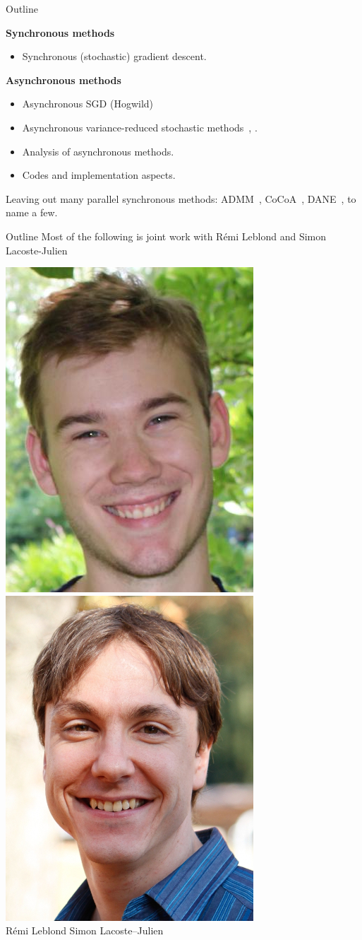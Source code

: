 \documentclass[10pt]{beamer}
\let\oldparencite=\parencite
\renewcommand{\parencite}[1]{\textcolor[rgb]{.7,.7,.7}{\oldparencite{#1}}}
\begin{document}
\begin{frame}{Outline}

{\centering \bfseries Synchronous methods}
\begin{itemize}
\item Synchronous (stochastic) gradient descent.
\end{itemize}
{\centering \bfseries Asynchronous methods}
\begin{itemize}
\item Asynchronous SGD (Hogwild)~\parencite{hogwild2011}
\item Asynchronous variance-reduced stochastic methods~\parencite{leblond2016Asaga}, \parencite{pedregosa2017proxasaga}.
\item Analysis of asynchronous methods. 
\item Codes and implementation aspects.
\end{itemize}

Leaving out many parallel synchronous methods: ADMM~\parencite{glowinski1975approximation}, CoCoA~\parencite{NIPS2014_5599}, DANE~\parencite{shamir2014communication}, to name a few.

\end{frame}

\begin{frame}{Outline}
Most of the following is joint work with Rémi Leblond and Simon Lacoste-Julien

{
\hspace{4.8em}\includegraphics[width=0.2\linewidth]{img/remi}
\hspace{4.8em}\includegraphics[width=0.2\linewidth]{img/SLJ}
}\\
{\normalsize\vphantom{}
\hspace{4em} R\'emi Leblond \hspace{3em} Simon Lacoste--Julien}\\

\end{frame}
\end{document}
